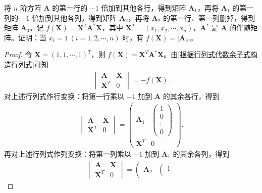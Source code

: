 \documentclass[../../main.tex]{subfiles}%
\begin{document}
\begin{example}
将 \(n\) 阶方阵 \(\boldsymbol{A}\) 的第一行的 \(-1\) 倍加到其他各行，得到矩阵 \(\boldsymbol{A}_1\)，再将 \(\boldsymbol{A}_1\) 的第一列的 \(-1\) 倍加到其他各列，得到矩阵 \(\boldsymbol{A}_2\)，再将 \(\boldsymbol{A}_2\) 的第一行、第一列删掉，得到矩阵 \(\boldsymbol{A}_3\)。记 \(f(\boldsymbol{X}) = \boldsymbol{X}^T \boldsymbol{A}^* \boldsymbol{X}\)，其中 \(\boldsymbol{X}^T = (x_1, x_2, \cdots, x_n)\)，\(\boldsymbol{A}^*\) 是 \(\boldsymbol{A}\) 的伴随矩阵。证明：当 \(x_i = 1 \ (i=1, 2, \cdots, n)\) 时，有 \(f(\boldsymbol{X}) = |\boldsymbol{A}_3|\)。
\end{example}
\begin{proof}
令 \(\boldsymbol{X} = (1, 1, \cdots, 1)^T\)，则 \(f(\boldsymbol{X}) = \boldsymbol{X}^T \boldsymbol{A}^* \boldsymbol{X}\)。由\cref{根据行列式代数余子式构造行列式}可知
\begin{align}
\label{eq:exercise1}
\begin{vmatrix} \boldsymbol{A} & \boldsymbol{X} \\ \boldsymbol{X}^T & 0 \end{vmatrix} = -f(\boldsymbol{X}).
\end{align}
对上述行列式作行变换：将第一行乘以 \(-1\) 加到 \(\boldsymbol{A}\) 的其余各行，得到
\begin{align*}
\begin{vmatrix} \boldsymbol{A} & \boldsymbol{X} \\ \boldsymbol{X}^T & 0 \end{vmatrix} = \begin{pmatrix} \boldsymbol{A}_1 & \begin{pmatrix} 1 \\ 0 \\ \vdots \\ 0 \end{pmatrix} \\ \boldsymbol{X}^T & 0 \end{pmatrix}.
\end{align*}
再对上述行列式作列变换：将第一列乘以 \(-1\) 加到 \(\boldsymbol{A}_1\) 的其余各列，得到
\begin{align*}
\begin{vmatrix} \boldsymbol{A} & \boldsymbol{X} \\ \boldsymbol{X}^T & 0 \end{vmatrix}=\left( \begin{matrix}
\boldsymbol{A}_2&		\left( \begin{array}{c}
1\\

\end{array}
\end{matrix}
\end{align*}
\end{proof}
\end{document}

